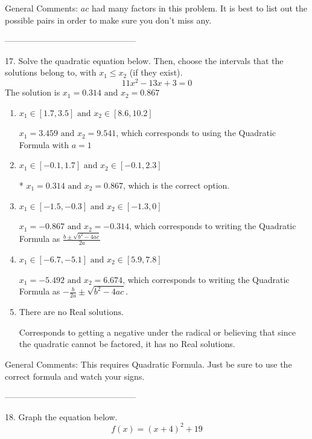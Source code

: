\documentclass{extbook}[14pt]
\begin{document}
General Comments: $ac$ had many factors in this problem. It is best to list out the possible pairs in order to make sure you don't miss any.

-----------------------------------------------

17. Solve the quadratic equation below. Then, choose the intervals that the solutions belong to, with $x_1 \leq x_2$ (if they exist).
\[ 11x^{2} -13 x + 3 = 0 \] 
The solution is $ x_1 = 0.314 \text{ and } x_2 = 0.867 $ 

\begin{enumerate}[label=\Alph*.] 
\item $ x_1 \in [1.7, 3.5] \text{ and } x_2 \in [8.6, 10.2] $ 

  $x_1 = 3.459 \text{ and } x_2 = 9.541$, which corresponds to using the Quadratic Formula with $a=1$ 
\item $ x_1 \in [-0.1, 1.7] \text{ and } x_2 \in [-0.1, 2.3] $ 

 * $x_1 = 0.314 \text{ and } x_2 = 0.867$, which is the correct option. 
\item $ x_1 \in [-1.5, -0.3] \text{ and } x_2 \in [-1.3, 0] $ 

  $x_1 = -0.867 \text{ and } x_2 = -0.314$, which corresponds to writing the Quadratic Formula as $\frac{b \pm \sqrt{b^2 - 4ac}}{2a}$ 
\item $ x_1 \in [-6.7, -5.1] \text{ and } x_2 \in [5.9, 7.8] $ 

  $x_1 = -5.492 \text{ and } x_2 = 6.674$, which corresponds to writing the Quadratic Formula as $-\frac{b}{2a} \pm \sqrt{b^2 - 4ac}$. 
\item $ \text{There are no Real solutions.} $ 

 Corresponds to getting a negative under the radical or believing that since the quadratic cannot be factored, it has no Real solutions. 
\end{enumerate} 
 
General Comments: This requires Quadratic Formula. Just be sure to use the correct formula and watch your signs.

-----------------------------------------------

18. Graph the equation below.
\[ f(x) = (x+4)^2 + 19 \] 
\end{document}
